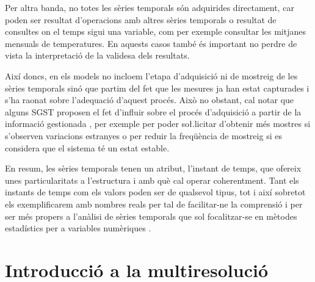
Per altra banda, no totes les sèries temporals són adquirides
directament, car poden ser resultat d'operacions amb altres sèries
temporals o resultat de consultes on el temps sigui una variable, com
per exemple consultar les mitjanes mensuals de temperatures. %
En aquests casos també és important no perdre de vista la
interpretació de la validesa dels resultats.




Així doncs, en els models no incloem l'etapa d'adquisició ni de
mostreig de les sèries temporals sinó que partim del fet que les
mesures ja han estat capturades i s'ha raonat sobre l'adequació
d'aquest procés. Això no obstant, cal notar que alguns \gls{SGST}
proposen el fet d'influir sobre el procés d'adquisició a partir de la
informació gestionada \parencite{madden05}, per exemple per poder
so\l.licitar d'obtenir més mostres si s'observen variacions estranyes
o per reduir la freqüència de mostreig si es considera que el sistema
té un estat estable.






En resum, les sèries temporals tenen un atribut, l'instant de temps,
que ofereix unes particularitats a l'estructura i amb què cal operar
coherentment. Tant els instants de temps com els valors poden ser de
qualsevol tipus, tot i així sobretot els exemplificarem amb nombres
reals per tal de facilitar-ne la comprensió i per ser més propers a
l'anàlisi de sèries temporals que sol focalitzar-se en mètodes
estadístics per a variables numèriques \parencite{last04:book}.








\section{Introducció a la multiresolució}

